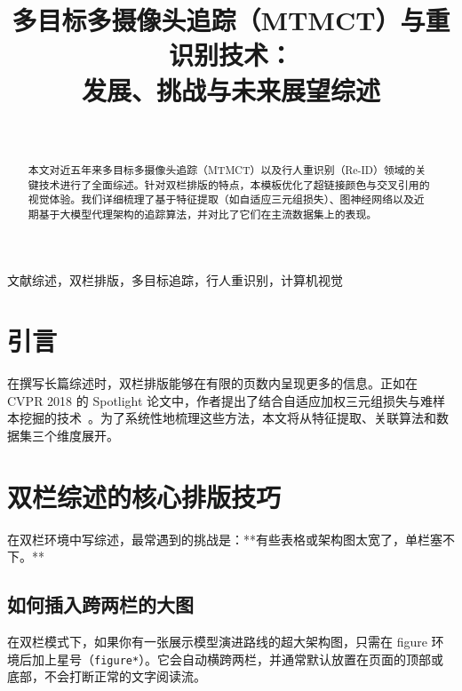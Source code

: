 \documentclass[journal,10pt]{IEEEtran} %
\begin{document}
\title{多目标多摄像头追踪（MTMCT）与重识别技术：\\ 发展、挑战与未来展望综述}

\author{
     \\
    \vspace{0.5em}
}

\maketitle

\begin{abstract}
\noindent 本文对近五年来多目标多摄像头追踪（MTMCT）以及行人重识别（Re-ID）领域的关键技术进行了全面综述。针对双栏排版的特点，本模板优化了超链接颜色与交叉引用的视觉体验。我们详细梳理了基于特征提取（如自适应三元组损失）、图神经网络以及近期基于大模型代理架构的追踪算法，并对比了它们在主流数据集上的表现。
\end{abstract}

\begin{IEEEkeywords}
文献综述，双栏排版，多目标追踪，行人重识别，计算机视觉
\end{IEEEkeywords}

\section{引言}
在撰写长篇综述时，双栏排版能够在有限的页数内呈现更多的信息。正如在 CVPR 2018 的 Spotlight 论文中，作者提出了结合自适应加权三元组损失与难样本挖掘的技术~\cite{ristani2018features}。为了系统性地梳理这些方法，本文将从特征提取、关联算法和数据集三个维度展开。

\section{双栏综述的核心排版技巧}

在双栏环境中写综述，最常遇到的挑战是：**有些表格或架构图太宽了，单栏塞不下。**

\subsection{如何插入跨两栏的大图}
在双栏模式下，如果你有一张展示模型演进路线的超大架构图，只需在 figure 环境后加上星号（\verb|figure*|）。它会自动横跨两栏，并通常默认放置在页面的顶部或底部，不会打断正常的文字阅读流。
\end{document}
